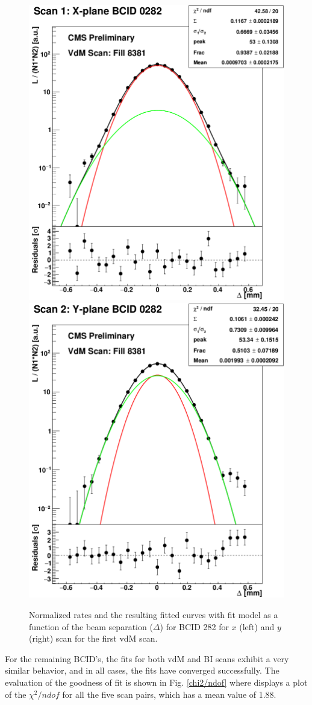 \begin{center}
\begin{figure}[h!]
\centering
\includegraphics[width=.45\textwidth]{Chapter4/xscan.png}
\includegraphics[width=.45\textwidth]{Chapter4/yscan.png}\\
\caption[Fit for the vdM1 BCIDs 282 (x and y directions)]{Normalized rates and the resulting fitted curves with  fit model as a function of the beam separation ($\Delta$) for BCID 282 for $x$ (left) and $y$ (right) scan for the first vdM scan.}
\label{vdM1_282_XYscan}
\end{figure}
\end{center}
For the remaining BCID's, the fits for both vdM and BI scans exhibit a very similar behavior, and in all cases, the fits have converged successfully. The evaluation of the goodness of fit is shown in Fig. \ref{chi2/ndof} where displays a plot of the $\chi^{2}/ndof$ for all the five scan pairs, which has a mean value of 1.88.

